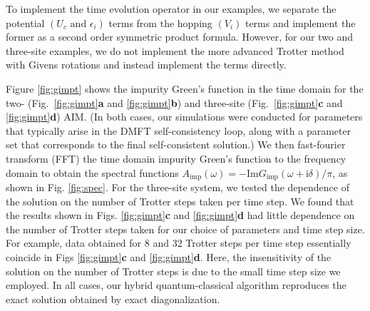 \documentclass[aip,reprint,table,xcdraw,usenames,dvipsnames]{revtex4-1}
\begin{document}
To implement the time evolution operator in our examples, we separate the 
potential $(U_c \text{ and } \epsilon_i )$ terms from the hopping $(V_i)$ terms and implement the former as a second order symmetric product formula. However, 
for our two and three-site examples,
we do not implement the more advanced Trotter method with Givens rotations and 
instead implement the terms directly. 

Figure \ref{fig:gimpt} shows the impurity Green's function in the time 
domain for the two- (Fig.~\ref{fig:gimpt}{\bf a} and \ref{fig:gimpt}{\bf b}) and three-site (Fig.~\ref{fig:gimpt}{\bf c} and \ref{fig:gimpt}{\bf d}) AIM. 
(In both cases, our simulations were conducted for parameters that typically arise in the DMFT self-consistency loop, along with a parameter set that corresponds to the final self-consistent solution.) We then fast-fourier transform (FFT) the time domain impurity Green's function to the frequency domain to obtain the spectral functions $A_\mathrm{imp}(\omega)=-\mathrm{Im}G_\mathrm{imp}(\omega + \mathrm{i}\delta)/\pi$, as shown in Fig. \ref{fig:spec}. For the three-site system, we tested the dependence of the solution on the number of Trotter steps taken per time step. We found that the results shown in Figs. \ref{fig:gimpt}{\bf c} and \ref{fig:gimpt}{\bf d} had little dependence on the number of Trotter steps taken for our choice of parameters and time step size. For example, data obtained for 8 and 32 Trotter steps per time step essentially coincide in Figs \ref{fig:gimpt}{\bf c} and \ref{fig:gimpt}{\bf d}. Here, the insensitivity of the solution on the number of Trotter steps is due to the small time step size we employed. In all cases, our hybrid quantum-classical algorithm reproduces the exact solution obtained by exact diagonalization. 
\end{document}
